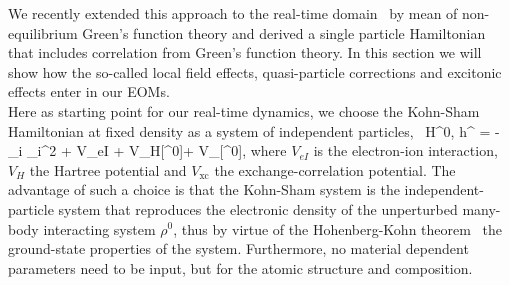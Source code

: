 We recently extended this approach to the real-time domain~\cite{attaccalite} by mean of non-equilibrium Green's function theory and derived a single particle Hamiltonian that includes correlation from Green's function theory. %
In this section we will show how the so-called local field effects, quasi-particle corrections and excitonic effects enter in our EOMs.\\
Here as starting point for our real-time dynamics, we choose the Kohn-Sham  Hamiltonian at fixed density as a system of independent particles,~\cite{PhysRev.140.A1133} 
\be
\hat H^{0,} \equiv \hat h^{} = -\sum_{i} \nabla_i^2 + \hat V_{eI} + \hat V_{H}[\rho^0]+ \hat V_{}[\rho^0],      
\label{eq:HIPA}
\ee
where $V_{eI}$ is the electron-ion interaction, $V_{H}$ the Hartree potential and $V_{\text{xc}}$ the exchange-correlation potential.
The advantage of such a choice is that the Kohn-Sham system is the independent-particle system that reproduces the electronic density of the unperturbed many-body interacting system $\rho^0$, thus by virtue of the Hohenberg-Kohn theorem~\cite{PhysRev.136.B864} the ground-state properties of the system. Furthermore, no material dependent parameters need to be input, but for the atomic structure and composition. 

